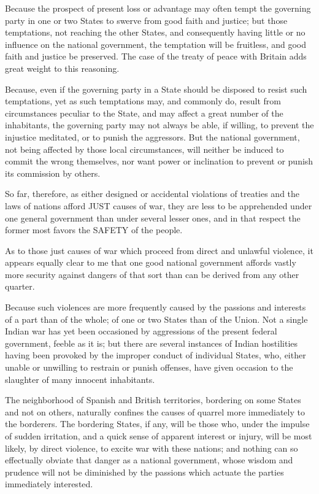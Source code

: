 Because the prospect of present loss or advantage may often
tempt the governing party in one or two States to swerve from good
faith and justice; but those temptations, not reaching the other
States, and consequently having little or no influence on the
national government, the temptation will be fruitless, and good
faith and justice be preserved. The case of the treaty of peace
with Britain adds great weight to this reasoning.

Because, even if the governing party in a State should be
disposed to resist such temptations, yet as such temptations may,
and commonly do, result from circumstances peculiar to the State,
and may affect a great number of the inhabitants, the governing
party may not always be able, if willing, to prevent the injustice
meditated, or to punish the aggressors. But the national
government, not being affected by those local circumstances, will
neither be induced to commit the wrong themselves, nor want power or
inclination to prevent or punish its commission by others.

So far, therefore, as either designed or accidental violations
of treaties and the laws of nations afford JUST causes of war, they
are less to be apprehended under one general government than under
several lesser ones, and in that respect the former most favors the
SAFETY of the people.

As to those just causes of war which proceed from direct and
unlawful violence, it appears equally clear to me that one good
national government affords vastly more security against dangers of
that sort than can be derived from any other quarter.

Because such violences are more frequently caused by the
passions and interests of a part than of the whole; of one or two
States than of the Union. Not a single Indian war has yet been
occasioned by aggressions of the present federal government, feeble
as it is; but there are several instances of Indian hostilities
having been provoked by the improper conduct of individual States,
who, either unable or unwilling to restrain or punish offenses, have
given occasion to the slaughter of many innocent inhabitants.

The neighborhood of Spanish and British territories, bordering
on some States and not on others, naturally confines the causes of
quarrel more immediately to the borderers. The bordering States, if
any, will be those who, under the impulse of sudden irritation, and
a quick sense of apparent interest or injury, will be most likely,
by direct violence, to excite war with these nations; and nothing
can so effectually obviate that danger as a national government,
whose wisdom and prudence will not be diminished by the passions
which actuate the parties immediately interested.

